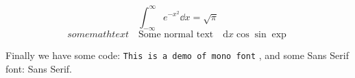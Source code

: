 \begin{equation}
	\int_{-\infty}^\infty e^{-x^2} \dd x = \sqrt{\pi}
\end{equation}
\begin{equation*}
	somemathtext \quad \text{Some normal text}\quad \text{d}x \cos \sin \exp
\end{equation*}


Finally we have some code: \texttt{This is a demo of mono font} , and some
Sans Serif font: \textsf{Sans Serif}.

